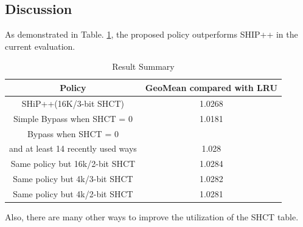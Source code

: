 \subsection{Discussion}
As demonstrated in Table. \ref{table.util}, the proposed policy outperforms SHIP++ in the current evaluation.
\begin{table}[htbp]
\caption{Result Summary}
\begin{center}
\begin{tabular}{|c|c|}
\hline
\textbf{Policy}&\textbf{GeoMean compared with LRU}\\
\hline
SHiP++(16K/3-bit SHCT) & 1.0268\\
\hline
Simple Bypass when SHCT = 0 & 1.0181\\
\hline
Bypass when SHCT = 0 \\and at least 14 recently used ways & 1.028\\
\hline
Same policy but 16k/2-bit SHCT &   1.0284\\
\hline
Same policy but 4k/3-bit SHCT  &   1.0282\\
\hline
Same policy but 4k/2-bit SHCT  &   1.0281\\
\hline
\end{tabular}
\label{table.util}
\end{center}
\end{table}
Also, there are many other ways to improve the utilization of the SHCT table.
